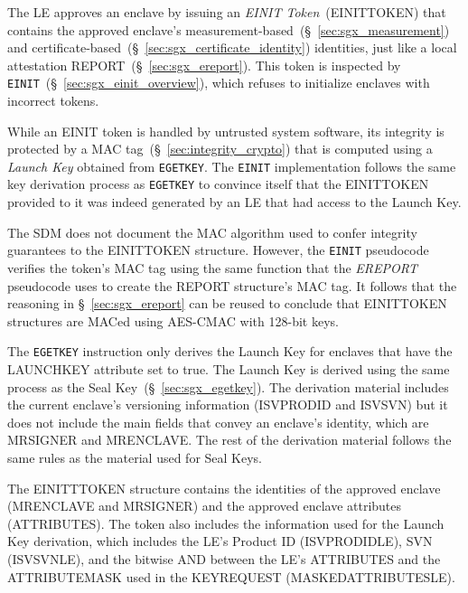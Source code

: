 
The LE approves an enclave by issuing an \textit{EINIT Token}~(EINITTOKEN) that
contains the approved enclave's
measurement-based~(\S~\ref{sec:sgx_measurement})
and certificate-based~(\S~\ref{sec:sgx_certificate_identity}) identities, just
like a local attestation REPORT~(\S~\ref{sec:sgx_ereport}). This token is
inspected by \texttt{EINIT}~(\S~\ref{sec:sgx_einit_overview}), which refuses to
initialize enclaves with incorrect tokens.

While an EINIT token is handled by untrusted system software, its integrity is
protected by a MAC tag~(\S~\ref{sec:integrity_crypto}) that is computed using a
\textit{Launch Key} obtained from \texttt{EGETKEY}. The \texttt{EINIT}
implementation follows the same key derivation process as \texttt{EGETKEY} to
convince itself that the EINITTOKEN provided to it was indeed generated by an
LE that had access to the Launch Key.

The SDM does not document the MAC algorithm used to confer integrity guarantees
to the EINITTOKEN structure. However, the \texttt{EINIT} pseudocode verifies
the token's MAC tag using the same function that the \textit{EREPORT} pseudocode
uses to create the REPORT structure's MAC tag. It follows that the reasoning in
\S~\ref{sec:sgx_ereport} can be reused to conclude that EINITTOKEN structures
are MACed using AES-CMAC with 128-bit keys.


The \texttt{EGETKEY} instruction only derives the Launch Key for enclaves that
have the LAUNCHKEY attribute set to true. The Launch Key is derived using the
same process as the Seal Key~(\S~\ref{sec:sgx_egetkey}). The derivation material
includes the current enclave's versioning information (ISVPRODID and ISVSVN)
but it does not include the main fields that convey an enclave's identity,
which are MRSIGNER and MRENCLAVE. The rest of the derivation material follows
the same rules as the material used for Seal Keys.

The EINITTTOKEN structure contains the identities of the approved enclave
(MRENCLAVE and MRSIGNER) and the approved enclave attributes (ATTRIBUTES). The
token also includes the information used for the Launch Key derivation,
which includes the LE's Product ID (ISVPRODIDLE), SVN (ISVSVNLE), and the
bitwise AND between the LE's ATTRIBUTES and the ATTRIBUTEMASK used in the
KEYREQUEST (MASKEDATTRIBUTESLE).

